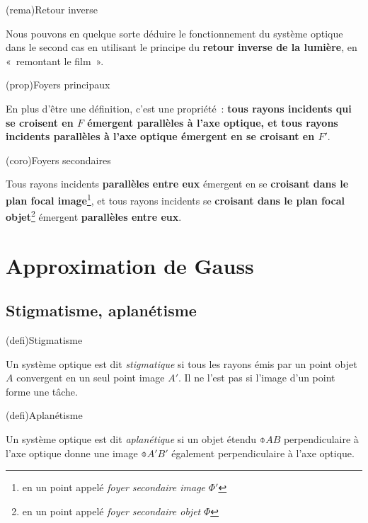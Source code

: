 \documentclass[../../main/main.tex]{subfiles}
\begin{document}
\begin{tcbraster}[raster columns=3, raster equal height=rows]
	\begin{tcb}[label=rema:retinv](rema){Retour inverse}

		Nous pouvons en quelque sorte déduire le fonctionnement du système
		optique dans le second cas en utilisant le principe du \textbf{retour
			inverse de la lumière}, en «~remontant le film~».

	\end{tcb}
	\begin{tcb}[label=prop:foy](prop){Foyers principaux}

		En plus d'être une définition, c'est une propriété~: \textbf{tous rayons
			incidents qui se croisent en $F$ émergent parallèles à l'axe
			optique, et tous rayons incidents parallèles à l'axe optique
			émergent en se croisant en $F'$}.

	\end{tcb}
	\begin{tcb}[label=coro:foysec](coro){Foyers secondaires}

		Tous rayons incidents \textbf{parallèles entre eux} émergent en se
		\textbf{croisant dans le plan focal image}\footnote{en un point appelé
			\textit{foyer secondaire image} $\Phi'$}, et tous rayons incidents se
		\textbf{croisant dans le plan focal objet}\footnote{en un point appelé
			\textit{foyer secondaire objet} $\Phi$} émergent \textbf{parallèles
			entre eux}.

	\end{tcb}
\end{tcbraster}

\section{Approximation de Gauss}

\subsection{Stigmatisme, aplanétisme}

\begin{tcbraster}[raster columns=2, raster equal height=rows]
	\begin{tcb}[label=def:stig](defi){Stigmatisme}

		Un système optique est dit \textit{stigmatique} si tous les rayons émis
		par un point objet $A$ convergent en un seul point image $A'$. Il ne
		l'est pas si l'image d'un point forme une tâche.

	\end{tcb}
	\begin{tcb}[label=def:apla](defi){Aplanétisme}

		Un système optique est dit \textit{aplanétique} si un objet étendu
		$\obar{AB}$ perpendiculaire à l'axe optique donne une image
		$\obar{A'B'}$ également perpendiculaire à l'axe optique.

	\end{tcb}
\end{tcbraster}
\end{document}
